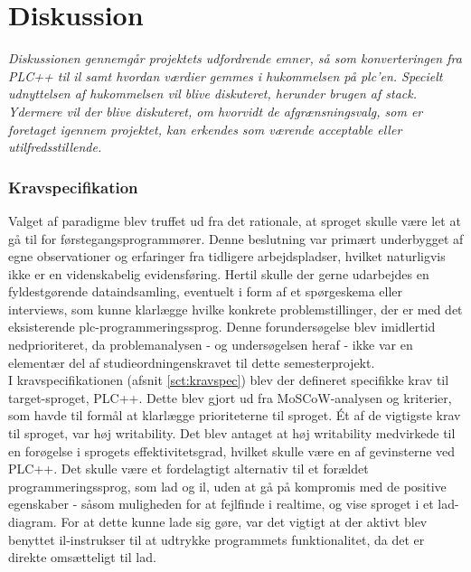 \chapter{Diskussion}\label{sec:Diskussion}
\textit{Diskussionen gennemgår projektets udfordrende emner, så som konverteringen fra PLC++ til \gls{il} samt hvordan værdier gemmes i hukommelsen på \gls{plc}'en.
Specielt udnyttelsen af hukommelsen vil blive diskuteret, herunder brugen af stack. 
Ydermere vil der blive diskuteret, om hvorvidt de afgrænsningsvalg, som er foretaget igennem projektet, kan erkendes som værende acceptable eller utilfredsstillende.}

\subsection*{Kravspecifikation}
Valget af paradigme blev truffet ud fra det rationale, at sproget skulle være let at gå til for førstegangsprogrammører. Denne beslutning var primært underbygget af egne observationer og erfaringer fra tidligere arbejdspladser, hvilket naturligvis ikke er en videnskabelig evidensføring. Hertil skulle der gerne udarbejdes en fyldestgørende dataindsamling, eventuelt i form af et spørgeskema eller interviews, som kunne klarlægge hvilke konkrete problemstillinger, der er med det eksisterende \gls{plc}-programmeringssprog. Denne forundersøgelse blev imidlertid nedprioriteret, da problemanalysen - og undersøgelsen heraf - ikke var en elementær del af studieordningenskravet til dette semesterprojekt. \\

\noindent I kravspecifikationen (afsnit \ref{sct:kravspec}) blev der defineret specifikke krav til target-sproget, PLC++. Dette blev gjort ud fra MoSCoW-analysen og kriterier, som havde til formål at klarlægge prioriteterne til sproget. Ét af de vigtigste krav til sproget, var høj writability. Det blev antaget at høj writability medvirkede til en forøgelse i sprogets effektivitetsgrad, hvilket skulle være en af gevinsterne ved PLC++. Det skulle være et fordelagtigt alternativ til et forældet programmeringssprog, som \gls{lad} og \gls{il}, uden at gå på kompromis med de positive egenskaber - såsom muligheden for at fejlfinde i realtime, og vise sproget i et \gls{lad}-diagram. 
For at dette kunne lade sig gøre, var det vigtigt at der aktivt blev benyttet \gls{il}-instrukser til at udtrykke programmets funktionalitet, da det er direkte omsætteligt til \gls{lad}. \\


